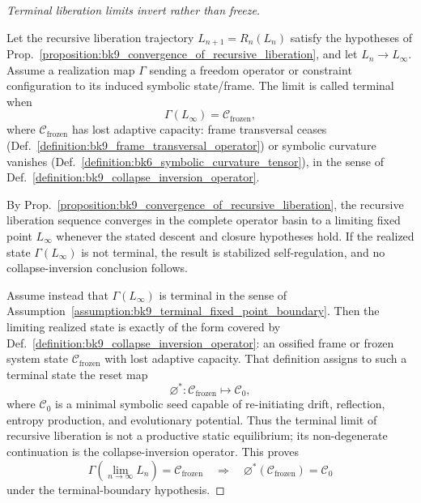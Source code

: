 \begin{proof}[Terminal liberation limits invert rather than freeze]
\label{proof:bk9_final_collapse_inversion_principle}
\leavevmode

\begin{assumption}
\label{assumption:bk9_terminal_fixed_point_boundary}
Let the recursive liberation trajectory \(L_{n+1}=R_n(L_n)\) satisfy the hypotheses of Prop.~\ref{proposition:bk9_convergence_of_recursive_liberation}, and let \(L_n\to L_\infty\). Assume a realization map \(\Gamma\) sending a freedom operator or constraint configuration to its induced symbolic state/frame. The limit is called terminal when
\[
\Gamma(L_\infty)=\mathcal{C}_{\mathrm{frozen}},
\]
where \(\mathcal{C}_{\mathrm{frozen}}\) has lost adaptive capacity: frame transversal ceases (Def.~\ref{definition:bk9_frame_transversal_operator}) or symbolic curvature vanishes (Def.~\ref{definition:bk6_symbolic_curvature_tensor}), in the sense of Def.~\ref{definition:bk9_collapse_inversion_operator}.
\end{assumption}

By Prop.~\ref{proposition:bk9_convergence_of_recursive_liberation}, the recursive liberation sequence converges in the complete operator basin to a limiting fixed point \(L_\infty\) whenever the stated descent and closure hypotheses hold. If the realized state \(\Gamma(L_\infty)\) is not terminal, the result is stabilized self-regulation, and no collapse-inversion conclusion follows.

Assume instead that \(\Gamma(L_\infty)\) is terminal in the sense of Assumption~\ref{assumption:bk9_terminal_fixed_point_boundary}. Then the limiting realized state is exactly of the form covered by Def.~\ref{definition:bk9_collapse_inversion_operator}: an ossified frame or frozen system state \(\mathcal{C}_{\mathrm{frozen}}\) with lost adaptive capacity. That definition assigns to such a terminal state the reset map
\[
\varnothing^*:\mathcal{C}_{\mathrm{frozen}}\mapsto\mathcal{C}_0,
\]
where \(\mathcal{C}_0\) is a minimal symbolic seed capable of re-initiating drift, reflection, entropy production, and evolutionary potential. Thus the terminal limit of recursive liberation is not a productive static equilibrium; its non-degenerate continuation is the collapse-inversion operator. This proves
\[
\Gamma\!\left(\lim_{n\to\infty}L_n\right)=\mathcal{C}_{\mathrm{frozen}}
\quad\Longrightarrow\quad
\varnothing^*(\mathcal{C}_{\mathrm{frozen}})=\mathcal{C}_0
\]
under the terminal-boundary hypothesis.
\end{proof}

